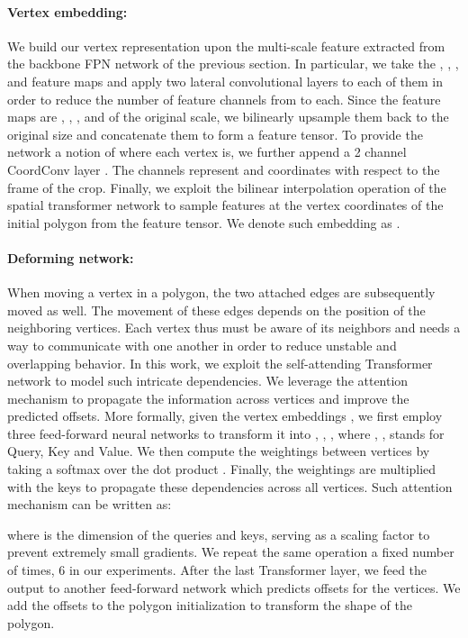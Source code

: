 \documentclass[10pt,twocolumn,letterpaper]{article}
\begin{document}
\paragraph{Vertex embedding:}
We build our vertex representation upon the multi-scale feature extracted from the backbone FPN network of the previous section. In particular, we take the , , ,  and  feature maps and apply two lateral convolutional layers to each of them in order to reduce the number of feature channels from  to  each. Since the feature maps are , , ,  and  of the original scale, we bilinearly upsample them back to the original size and concatenate them to form a  feature tensor. 
To provide the network a notion of where each vertex is, we further append a 2 channel CoordConv layer \cite{coordconv}. The channels represent  and  coordinates with respect to the frame of the crop. Finally, we exploit the bilinear interpolation operation of the spatial transformer network \cite{jaderberg2015spatial} to sample features at the vertex coordinates of the initial polygon from  the feature tensor. 
We denote such  embedding as . 



\vspace{-1mm}
\paragraph{Deforming network:}
When moving a vertex in a polygon, the two attached edges are subsequently moved as well. The movement of these edges depends on the position of the neighboring vertices. Each vertex thus must be aware of its neighbors and needs a way to communicate with one another in order to reduce unstable and overlapping behavior. 
In this work, we exploit the self-attending Transformer network \cite{transformer} to model such intricate dependencies. We leverage the attention mechanism to propagate the information across vertices and improve the predicted offsets.
More formally, given the vertex embeddings , we first employ three feed-forward neural networks to transform it into , , , where , ,  stands for Query, Key and Value. We then compute the weightings between vertices by taking a softmax over the dot product . Finally, the weightings are multiplied with the keys  to propagate these dependencies across all vertices. Such attention mechanism can be written as:

where  is the dimension of the queries and keys, serving as a scaling factor to prevent extremely small gradients. We repeat the same operation a fixed number of times, 6 in our experiments. After the last Transformer layer, we feed the output to another feed-forward network which predicts  offsets for the vertices. We add the offsets to the polygon initialization to transform the shape of the polygon.
\end{document}
